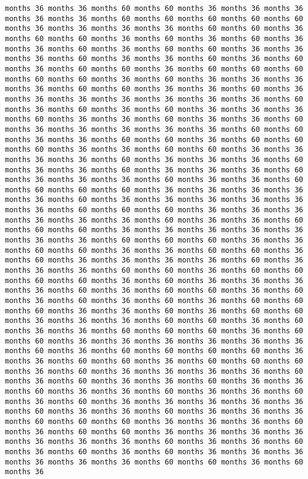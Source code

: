 \documentclass[11pt]{article}
\begin{document}
\begin{Verbatim}[commandchars=\\\{\}, frame=single, framerule=2mm, rulecolor=\color{outerrorbackground}]
months 36 months 36 months 60 months 60 months 36 months 36 months 36 months 36 months 36 months 60 months 60 months 60 months 60 months 60 months 36 months 36 months 36 months 36 months 60 months 60 months 36 months 60 months 60 months 36 months 60 months 36 months 60 months 36 months 36 months 60 months 36 months 60 months 60 months 36 months 36 months 36 months 60 months 36 months 36 months 60 months 36 months 60 months 36 months 60 months 60 months 36 months 60 months 60 months 60 months 60 months 60 months 36 months 60 months 36 months 36 months 36 months 36 months 60 months 60 months 36 months 36 months 60 months 36 months 36 months 36 months 36 months 36 months 36 months 36 months 60 months 36 months 60 months 36 months 60 months 36 months 36 months 36 months 60 months 36 months 36 months 60 months 36 months 36 months 60 months 36 months 36 months 36 months 36 months 36 months 60 months 60 months 36 months 36 months 60 months 60 months 36 months 60 months 60 months 60 months 36 months 36 months 60 months 60 months 36 months 36 months 36 months 36 months 60 months 36 months 36 months 36 months 60 months 36 months 36 months 60 months 36 months 36 months 36 months 60 months 36 months 36 months 36 months 60 months 36 months 36 months 60 months 60 months 60 months 60 months 36 months 36 months 36 months 36 months 36 months 60 months 36 months 36 months 36 months 36 months 36 months 36 months 60 months 60 months 60 months 36 months 36 months 36 months 36 months 36 months 36 months 60 months 36 months 36 months 60 months 60 months 60 months 36 months 36 months 36 months 36 months 36 months 36 months 36 months 60 months 60 months 60 months 36 months 36 months 60 months 60 months 36 months 36 months 60 months 60 months 36 months 60 months 36 months 36 months 36 months 36 months 60 months 36 months 36 months 36 months 60 months 60 months 36 months 60 months 60 months 60 months 60 months 36 months 60 months 36 months 36 months 36 months 36 months 60 months 36 months 60 months 60 months 36 months 60 months 36 months 60 months 36 months 60 months 36 months 60 months 60 months 60 months 36 months 36 months 60 months 36 months 60 months 60 months 36 months 36 months 36 months 60 months 60 months 36 months 60 months 36 months 36 months 60 months 60 months 60 months 36 months 60 months 60 months 36 months 36 months 36 months 36 months 36 months 36 months 60 months 36 months 60 months 60 months 60 months 60 months 36 months 36 months 60 months 60 months 36 months 60 months 60 months 60 months 36 months 60 months 36 months 36 months 36 months 36 months 60 months 36 months 60 months 36 months 36 months 60 months 36 months 36 months 60 months 36 months 36 months 60 months 36 months 36 months 60 months 36 months 60 months 36 months 36 months 36 months 36 months 36 months 60 months 36 months 36 months 60 months 36 months 36 months 36 months 60 months 60 months 60 months 36 months 36 months 36 months 60 months 36 months 60 months 60 months 36 months 36 months 36 months 36 months 36 months 36 months 36 months 60 months 36 months 36 months 60 months 36 months 60 months 36 months 60 months 36 months 36 months 36 months 36 months 36 months 36 months 60 months 60 months 36 months 60 months 36 
\end{Verbatim}
\end{document}
